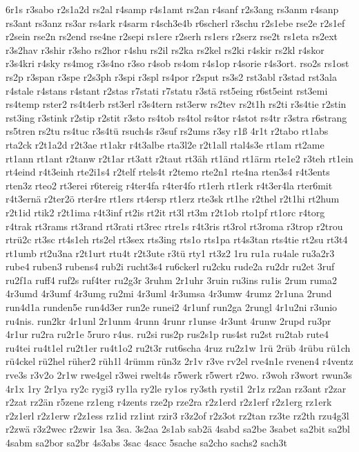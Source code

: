 {6r1s
r3sabo
r2s1a2d
rs2al
r4samp
r4s1amt
rs2an
r4sanf
r2s3ang
rs3anm
r4sanp
rs3ant
rs3anz
rs3ar
rs4ark
r4sarm
r4sch3e4b
r6scherl
r3schu
r2s1ebe
rse2e
r2s1ef
r2sein
rse2n
rs2end
rse4ne
r2sepi
rs1ere
r2serh
rs1ers
r2serz
rse2t
rs1eta
rs2ext
r3s2hav
r3shir
r3sho
rs2hor
r4shu
rs2il
rs2ka
rs2kel
rs2ki
r4skir
rs2kl
r4skor
r3s4kri
r4sky
rs4mog
r3s4no
r3so
r4sob
rs4om
r4s1op
r4sorie
r4s3ort.
rso2s
rs1ost
rs2p
r3span
r3spe
r2s3ph
r3spi
r3spl
rs4por
r2sput
rs3s2
rst3abl
r3stad
rst3ala
r4stale
r4stans
r4stant
r2stas
r7stati
r7statu
r3stä
rst5eing
r6st5eint
rst3emi
rs4temp
rster2
rs4t4erb
rst3erl
r3s4tern
rst3erw
rs2tev
rs2t1h
rs2ti
r3s4tie
r2stin
rst3ing
r3stink
r2stip
r2stit
r3sto
rs4tob
rs4tol
rs4tor
r4stot
rs4tr
r3stra
r6strang
rs5tren
rs2tu
rs4tuc
r3s4tü
rsuch4s
r3suf
rs2ums
r3sy
r1ß
4r1t
r2tabo
rt1abs
rta2ck
r2t1a2d
r2t3ae
rt1akr
r4t3albe
rta3l2e
r2t1all
rtal4s3e
rt1am
rt2ame
rt1ann
rt1ant
r2tanw
r2t1ar
rt3att
r2taut
rt3äh
rt1änd
rt1ärm
rte1e2
r3teh
rt1ein
rt4eind
r4t3einh
rte2i1s4
r2telf
rtels4t
r2temo
rte2n1
rte4na
rten3s4
r4t3ents
rten3z
rteo2
rt3erei
r6tereig
r4ter4fa
r4ter4fo
rt1erh
rt1erk
r4t3er4la
rter6mit
r4t3ernä
r2ter2ö
rter4re
rt1ers
rt4ersp
rt1erz
rte3sk
rt1he
r2thel
r2t1hi
rt2hum
r2t1id
rtik2
r2t1ima
r4t3inf
rt2is
rt2it
rt3l
rt3m
r2t1ob
rto1pf
rt1orc
r4torg
r4trak
rt3rams
rt3rand
rt3rati
rt3rec
rtre1s
r4t3ris
rt3rol
rt3roma
r3trop
r2trou
rtrü2c
rt3sc
rt4s1eh
rts2el
rt3sex
rts3ing
rts1o
rts1pa
rt4s3tan
rts4tie
rt2su
rt3t4
rt1umb
rt2u3na
r2t1urt
rtu4t
r2t3ute
r3tü
rty1
rt3z2
1ru
ru1a
ru4ale
ru3a2r3
rube4
ruben3
rubens4
rub2i
rucht3s4
ru6ckerl
ru2cku
rude2a
ru2dr
ru2et
3ruf
ru2f1a
ruff4
ruf2s
ruf4ter
ru2g3r
3ruhm
2r1uhr
3ruin
ru3ins
ru1is
2rum
ruma2
4r3umd
4r3umf
4r3umg
ru2mi
4r3uml
4r3umsa
4r3umw
4rumz
2r1una
2rund
run4d1a
runden5e
run4d3er
run2e
runei2
4r1unf
run2ga
2rungl
4r1u2ni
r3unio
ru4nis.
run2kr
4r1unl
2r1unm
4runn
4runr
r1unse
4r3unt
4runw
2rupd
ru3pr
4r1ur
ru2ra
ru2r1e
5ruro
r4us.
ru2si
rus2p
rus2s1p
rus4st
ru2st
ru2tab
rute4
ru4tei
ru4t1el
ru2t1er
ru4t1o2
ru2t3r
rut6scha
4ruz
ru2z1w
1rü
2rüb
4rübu
rü1ch
rü4ckel
rü2hel
rüher2
rüh1l
4rümm
rün3z
2r1v
r3ve
rv2el
rve4n1e
rvenen4
r4ventz
rve3s
r3v2o
2r1w
rwe4gel
r3wei
rwelt4s
r5werk
r5wert
r2wo.
r3woh
r3wort
rwun3s
4r1x
1ry
2r1ya
ry2c
rygi3
ry1la
ry2le
ry1os
ry3sth
rysti1
2r1z
rz2an
rz3ant
r2zar
r2zat
rz2än
r5zene
rz1eng
r4zents
rze2p
rze2ra
r2z1erd
r2z1erf
r2z1erg
rz1erk
r2z1erl
r2z1erw
r2z1ess
rz1id
rz1int
rzir3
r3z2of
r2z3ot
rz2tan
rz3te
rz2th
rzu4g3l
r2zwä
r3z2wec
r2zwir
1sa
3sa.
3s2aa
2s1ab
sab2ä
4sabd
sa2be
3sabet
sa2bit
sa2bl
4sabm
sa2bor
sa2br
4s3abs
3sac
4sacc
5sache
sa2cho
sachs2
sach3t
}
